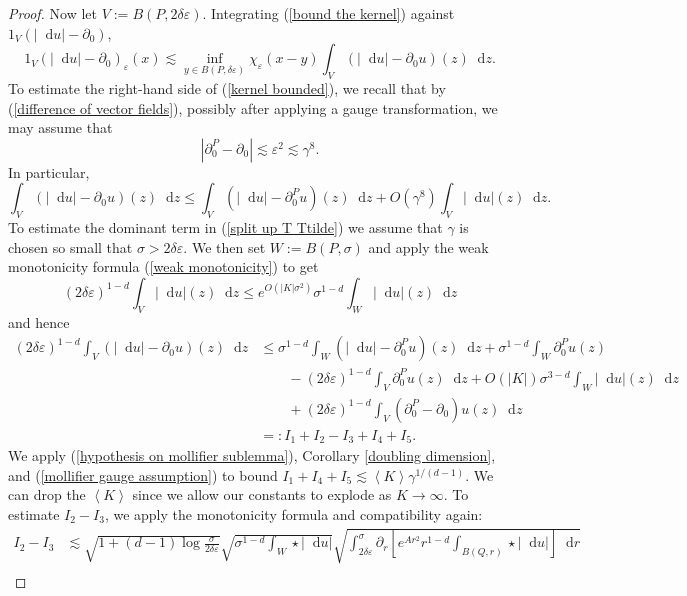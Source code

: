 \documentclass[reqno,11pt]{amsart}
\newcommand*\dif{\mathop{}\!\mathrm{d}}
\def\Japan#1{\left \langle #1 \right \rangle}
\theoremstyle{definition}
\numberwithin{equation}{section}
\begin{document}
\begin{proof}
Now let $V := B(P, 2\delta\varepsilon)$.
Integrating (\ref{bound the kernel}) against $1_V(|\dif u| - \partial_0)$,
\begin{equation}\label{kernel bounded}
    1_V(|\dif u| - \partial_0)_\varepsilon(x) \lesssim \inf_{y \in B(P, \delta\varepsilon)} \chi_\varepsilon(x - y) \int_V (|\dif u| - \partial_0 u)(z) \dif z.
\end{equation}
To estimate the right-hand side of (\ref{kernel bounded}), we recall that by (\ref{difference of vector fields}), possibly after applying a gauge transformation, we may assume that
\begin{equation}\label{mollifier gauge assumption}
|\partial_0^P - \partial_0| \lesssim \varepsilon^2 \lesssim \gamma^8.
\end{equation}
In particular,
\begin{equation}\label{split up T Ttilde}
\int_V (|\dif u| - \partial_0u)(z) \dif z \leq \int_V (|\dif u| - \partial_0^P u)(z) \dif z + O(\gamma^8) \int_V |\dif u|(z) \dif z.
\end{equation}
To estimate the dominant term in (\ref{split up T Ttilde}) we assume that $\gamma$ is chosen so small that $\sigma > 2\delta\varepsilon$.
We then set $W := B(P, \sigma)$ and apply the weak monotonicity formula (\ref{weak monotonicity}) to get 
$$(2\delta\varepsilon)^{1 - d} \int_V |\dif u|(z) \dif z \leq e^{O(|K| \sigma^2)} \sigma^{1 - d} \int_W |\dif u|(z) \dif z$$
and hence
\begin{align*}
    (2\delta\varepsilon)^{1 - d} \int_V (|\dif u| - \partial_0 u)(z) \dif z
    &\leq \sigma^{1 - d} \int_W (|\dif u| - \partial_0^P u)(z) \dif z + \sigma^{1 - d} \int_W \partial_0^P u(z) \\
    &\qquad - (2\delta\varepsilon)^{1 - d} \int_V \partial_0^P u(z) \dif z + O(|K|) \sigma^{3 - d} \int_W |\dif u|(z) \dif z \\
    &\qquad + (2\delta\varepsilon)^{1 - d} \int_V (\partial_0^P - \partial_0)u(z) \dif z\\
    &=: I_1 + I_2 - I_3 + I_4 + I_5.
\end{align*}
We apply (\ref{hypothesis on mollifier sublemma}), Corollary \ref{doubling dimension}, and (\ref{mollifier gauge assumption}) to bound $I_1 + I_4 + I_5 \lesssim \Japan K \gamma^{1/(d - 1)}$.
We can drop the $\Japan K$ since we allow our constants to explode as $K \to \infty$.
To estimate $I_2 - I_3$, we apply the monotonicity formula and compatibility again:
\begin{align*}
I_2 - I_3 &\lesssim \sqrt{1 + (d - 1) \log \frac{\sigma}{2\delta\varepsilon}} \sqrt{\sigma^{1 - d} \int_W \star |\dif u|} \sqrt{\int_{2\delta\varepsilon}^\sigma \partial_r \left[e^{Ar^2} r^{1 - d} \int_{B(Q, r)} \star |\dif u|\right] \dif r}\\

\end{align*}
\end{proof}
\end{document}
